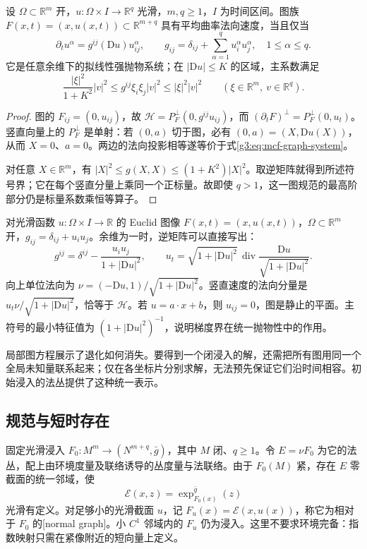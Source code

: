 \begin{proposition}\label{g3:prop:mcf-graph-equation}
	设 \(\Omega\subset\mathbb R^m\) 开，\(u:\Omega\times I\to\mathbb R^q\) 光滑，\(m,q\ge1\)，\(I\) 为时间区间。图族 \(F(x,t)=(x,u(x,t))\subset\mathbb R^{m+q}\) 具有平均曲率法向速度，当且仅当
	\begin{equation}\label{g3:eq:mcf-graph-system}
		\partial_tu^\alpha=g^{ij}(\mathrm Du)u^\alpha_{ij},
		\qquad g_{ij}=\delta_{ij}+\sum_{\alpha=1}^q u_i^\alpha u_j^\alpha,
		\quad 1\le\alpha\le q.
	\end{equation}
	它是任意余维下的拟线性强抛物系统；在 \(|\mathrm Du|\le K\) 的区域，主系数满足
	\[
	\frac{|\xi|^2}{1+K^2}|v|^2
	\le g^{ij}\xi_i\xi_j|v|^2\le |\xi|^2|v|^2
	\qquad(\xi\in\mathbb R^m,\ v\in\mathbb R^q).
	\]
\end{proposition}
\begin{proof}
	图的 \(F_{ij}=(0,u_{ij})\)，故
	\(\mathcal H=P_F^\perp(0,g^{ij}u_{ij})\)，而
	\((\partial_tF)^\perp=P_F^\perp(0,u_t)\)。竖直向量上的 \(P_F^\perp\) 是单射：若 \((0,a)\) 切于图，必有 \((0,a)=(X,\mathrm Du(X))\)，从而 \(X=0\)、\(a=0\)。两边的法向投影相等遂等价于式\eqref{g3:eq:mcf-graph-system}。

	对任意 \(X\in\mathbb R^m\)，有
	\(|X|^2\le g(X,X)\le(1+K^2)|X|^2\)。取逆矩阵就得到所述符号界；它在每个竖直分量上乘同一个正标量。故即使 \(q>1\)，这一图规范的最高阶部分仍是标量系数乘恒等算子。
\end{proof}

\begin{example}\label{g3:exm:mcf-scalar-graph}
	对光滑函数 \(u:\Omega\times I\to\mathbb R\) 的 Euclid 图像 \(F(x,t)=(x,u(x,t))\)，\(\Omega\subset\mathbb R^m\) 开，\(g_{ij}=\delta_{ij}+u_i u_j\)。余维为一时，逆矩阵可以直接写出：
	\[
	g^{ij}=\delta^{ij}-\frac{u_i u_j}{1+|\mathrm Du|^2},\qquad
	u_t=\sqrt{1+|\mathrm Du|^2}\,
	\operatorname{div}\frac{\mathrm Du}{\sqrt{1+|\mathrm Du|^2}}.
	\]
	向上单位法向为 \(\nu=(-\mathrm Du,1)/\sqrt{1+|\mathrm Du|^2}\)。竖直速度的法向分量是
	\(u_t\nu/\sqrt{1+|\mathrm Du|^2}\)，恰等于 \(\mathcal H\)。若 \(u=a\cdot x+b\)，则 \(u_{ij}=0\)，图是静止的平面。主符号的最小特征值为 \((1+|\mathrm Du|^2)^{-1}\)，说明梯度界在统一抛物性中的作用。
\end{example}

局部图方程展示了退化如何消失。要得到一个闭浸入的解，还需把所有图用同一个全局未知量联系起来；仅在各坐标片分别求解，无法预先保证它们沿时间相容。初始浸入的法丛提供了这种统一表示。

\subsection{规范与短时存在}
\label{g3:subsec:2801:03}
固定光滑浸入 \(F_0:M^m\to(N^{m+q},\bar g)\)，其中 \(M\) 闭、\(q\ge1\)。令 \(E=\nu F_0\) 为它的法丛，配上由环境度量及联络诱导的丛度量与法联络。由于 \(F_0(M)\) 紧，存在 \(E\) 零截面的统一邻域，使
\[
\mathscr E(x,z)=\exp_{F_0(x)}^{\bar g}(z)
\]
光滑有定义。对足够小的光滑截面 \(u\)，记
\(F_u(x)=\mathscr E(x,u(x))\)，称它为相对于 \(F_0\) 的[normal graph]。小 \(C^1\) 邻域内的 \(F_u\) 仍为浸入。这里不要求环境完备：指数映射只需在紧像附近的短向量上定义。

